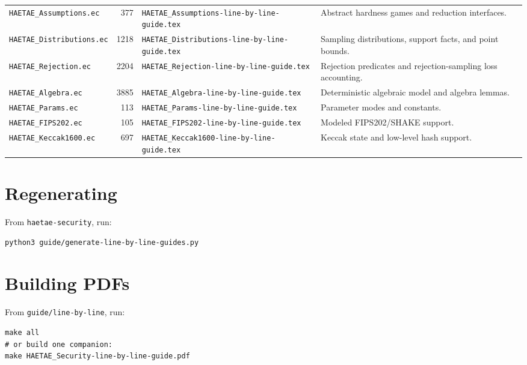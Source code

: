 \documentclass[11pt]{article}
\newcommand{\file}[1]{\nolinkurl{#1}}
\begin{document}
\begin{longtable}{L{0.24\textwidth} r L{0.28\textwidth} L{0.34\textwidth}}
\file{HAETAE\_Assumptions.ec} & 377 & \file{HAETAE\_Assumptions-line-by-line-guide.tex} & Abstract hardness games and reduction interfaces. \\
\file{HAETAE\_Distributions.ec} & 1218 & \file{HAETAE\_Distributions-line-by-line-guide.tex} & Sampling distributions, support facts, and point bounds. \\
\file{HAETAE\_Rejection.ec} & 2204 & \file{HAETAE\_Rejection-line-by-line-guide.tex} & Rejection predicates and rejection-sampling loss accounting. \\
\file{HAETAE\_Algebra.ec} & 3885 & \file{HAETAE\_Algebra-line-by-line-guide.tex} & Deterministic algebraic model and algebra lemmas. \\
\file{HAETAE\_Params.ec} & 113 & \file{HAETAE\_Params-line-by-line-guide.tex} & Parameter modes and constants. \\
\file{HAETAE\_FIPS202.ec} & 105 & \file{HAETAE\_FIPS202-line-by-line-guide.tex} & Modeled FIPS202/SHAKE support. \\
\file{HAETAE\_Keccak1600.ec} & 697 & \file{HAETAE\_Keccak1600-line-by-line-guide.tex} & Keccak state and low-level hash support. \\
\bottomrule
\end{longtable}

\section*{Regenerating}
From \file{haetae-security}, run:
\begin{verbatim}
python3 guide/generate-line-by-line-guides.py
\end{verbatim}

\section*{Building PDFs}
From \file{guide/line-by-line}, run:
\begin{verbatim}
make all
# or build one companion:
make HAETAE_Security-line-by-line-guide.pdf
\end{verbatim}
\end{document}
